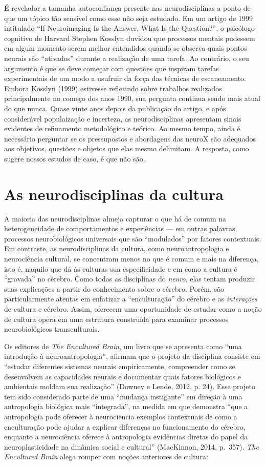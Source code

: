 É revelador a tamanha autoconfiança presente nas neurodisciplinas a
ponto de que um tópico tão sensível como esse não seja estudado. Em um
artigo de 1999 intitulado ``If Neuroimaging Is the Answer, What Is the
Question?'', o psicólogo cognitivo de Harvard Stephen Kosslyn duvidou
que processos mentais pudessem em algum momento serem melhor entendidos
quando se observa quais pontos neurais são ``ativados'' durante a
realização de uma tarefa. Ao contrário, o seu argumento é que se deve
começar com questões que inspiram tarefas experimentais de um modo a
usufruir da força das técnicas de escaneamento. Embora Kosslyn (1999)
estivesse refletindo sobre trabalhos realizados principalmente no começo
dos anos 1990, sua pergunta continua sendo mais atual do que nunca.
Quase vinte anos depois da publicação do artigo, e após considerável
populaização e incerteza, as neurodisciplinas apresentam sinais
evidentes de refinamento metodológico e teórico. Ao mesmo tempo, ainda é
necessário perguntar se os pressupostos e abordagens das neuroX são
adequados aos objetivos, questões e objetos que elas mesmo delimitam. A
resposta, como sugere nossos estudos de caso, é que não são.

\section{As neurodisciplinas da cultura}

A maioria das neurodisciplinas almeja capturar o que há de comum na
heterogeneidade de comportamentos e experiências --- em outras palavras,
processos neurobiológicos universais que são ``modulados'' por fatores
contextuais. Em contraste, as neurodisciplinas da cultura, como
neuroantropologia e neurociência cultural, se concentram menos no que é
comum e mais na diferença, isto é, naquilo que dá às culturas sua
especificidade e em como a cultura é ``gravada'' no cérebro. Como todas
as disciplinas do \emph{neuro}, elas tentam produzir suas explicações a
partir do conhecimento sobre o cérebro. Porém, são particularmente
atentas em enfatizar a ``enculturação'' do cérebro e as
\emph{interações} de cultura e cérebro. Assim, oferecem uma oportunidade
de estudar como a noção de cultura opera em uma estrutura construída
para examinar processos neurobiológicos transculturais.

Os editores de \emph{The Encultured Brain}, um livro que se apresenta
como ``uma introdução à neuroantropologia'', afirmam que o projeto da
disciplina consiste em ``estudar diferentes sistemas neurais
empiricamente, compreender como se desenvolvem as capacidades neurais e
documentar quais fatores biológicos e ambientais moldam sua realização''
(Downey e Lende, 2012, p. 24). Esse projeto tem sido considerado parte
de uma ``mudança instigante'' em direção à uma antropologia biológica
mais ``integrada'', na medida em que demonstra ``que a antropologia pode
oferecer à neurociência exemplos contextuais de como a enculturação pode
ajudar a explicar diferenças no funcionamento do cérebro, enquanto a
neurociência oferece à antropologia evidências diretas do papel da
neuroplasticidade na dinâmica social e cultural'' (MacKinnon, 2014,
p.~357). \emph{The Encultured Brain} alega romper com noções anteriores
de cultura:

